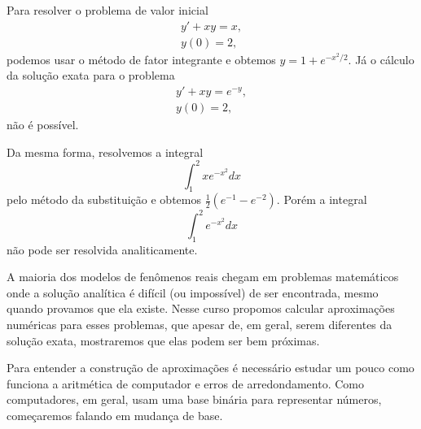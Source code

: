\documentclass[main.tex]{subfiles}
\begin{document}
Para resolver o problema de valor inicial 
$$
\begin{array}{l}
y'+xy=x,\\
y(0)=2,
\end{array}
$$
podemos usar o método de fator integrante e obtemos $y=1+e^{-x^2/2}$. Já o cálculo da solução exata para o problema 
$$
\begin{array}{l}
y'+xy=e^{-y},\\
y(0)=2,
\end{array}
$$
não é possível.

Da mesma forma, resolvemos a integral
$$
\int_1^2xe^{-x^2}dx
$$
pelo método da substituição e obtemos $\frac{1}{2}(e^{-1}-e^{-2})$. Porém a integral
$$
\int_1^2 e^{-x^2} dx
$$
não pode ser resolvida analiticamente.

A maioria dos modelos de fenômenos reais chegam em problemas matemáticos onde a solução analítica é difícil (ou impossível) de ser encontrada, mesmo quando provamos que ela existe. Nesse curso propomos calcular aproximações numéricas para esses problemas, que apesar de, em geral, serem diferentes da solução exata, mostraremos que elas podem ser bem próximas.

Para entender a construção de aproximações é necessário estudar um pouco como funciona a aritmética de computador e erros de arredondamento. Como computadores, em geral, usam uma base binária para representar números, começaremos falando em mudança de base.
\end{document}
